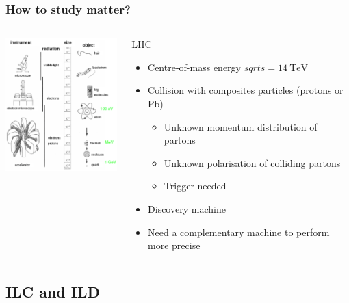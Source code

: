 \documentclass{beamer}
\begin{document}
  \begin{frame}
    \frametitle{How to study matter?}

    \begin{columns}[c]
      \begin{column}{5cm}
        \centering
        \includegraphics[width = 5cm]{Pictures/instrument.png}
      \end{column}
      \begin{column}{5cm}
        \begin{block}{LHC}
          \begin{itemize}
            \item Centre-of-mass energy $sqrt{s} = 14~\text{TeV}$
            \item Collision with composites particles (protons or Pb)
                \begin{itemize}
                    \item Unknown momentum distribution of partons
                    \item Unknown polarisation of colliding partons
                    \item Trigger needed
                \end{itemize}
            \item Discovery machine
            \item Need a complementary machine to perform more precise
          \end{itemize}
        \end{block}
      \end{column}
    \end{columns}
  \end{frame}
    
    \subsection{ILC and ILD}
\end{document}
